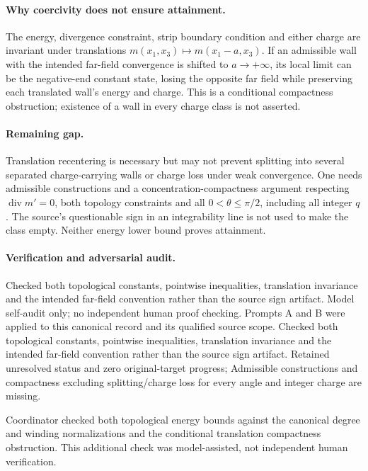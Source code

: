 \documentclass[11pt]{article}
\begin{document}
\paragraph{Why coercivity does not ensure attainment.} The energy, divergence constraint, strip boundary condition and either charge are invariant under translations $m(x_1,x_3)\mapsto m(x_1-a,x_3)$. If an admissible wall with the intended far-field convergence is shifted to $a\to+\infty$, its local limit can be the negative-end constant state, losing the opposite far field while preserving each translated wall's energy and charge. This is a conditional compactness obstruction; existence of a wall in every charge class is not asserted.

\paragraph{Remaining gap.} Translation recentering is necessary but may not prevent splitting into several separated charge-carrying walls or charge loss under weak convergence. One needs admissible constructions and a concentration-compactness argument respecting $\operatorname{div}m'=0$, both topology constraints and all $0<\theta\leq\pi/2$, including all integer $q$. The source's questionable sign in an integrability line is not used to make the class empty. Neither energy lower bound proves attainment.

\paragraph{Verification and adversarial audit.}
Checked both topological constants, pointwise inequalities, translation invariance and the intended far-field convention rather than the source sign artifact. Model self-audit only; no independent human proof checking. Prompts A and B were applied to this canonical record and its qualified source scope. Checked both topological constants, pointwise inequalities, translation invariance and the intended far-field convention rather than the source sign artifact. Retained unresolved status and zero original-target progress; Admissible constructions and compactness excluding splitting/charge loss for every angle and integer charge are missing.

Coordinator checked both topological energy bounds against the canonical degree and winding normalizations and the conditional translation compactness obstruction. This additional check was model-assisted, not independent human verification.
\end{document}
